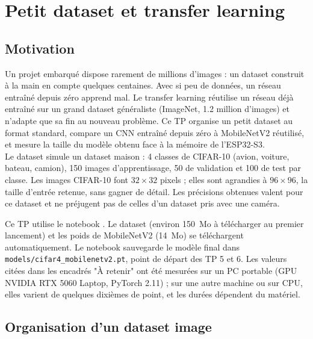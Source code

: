 
\chapter{Petit dataset et transfer learning}

\section*{Motivation}

Un projet embarqué dispose rarement de millions d'images : un dataset construit à la main en compte quelques centaines. Avec si peu de données, un réseau entraîné depuis zéro apprend mal. Le transfer learning réutilise un réseau déjà entraîné sur un grand dataset généraliste (ImageNet, 1.2 million d'images) et n'adapte que sa fin au nouveau problème. Ce TP organise un petit dataset au format standard, compare un CNN entraîné depuis zéro à MobileNetV2 réutilisé, et mesure la taille du modèle obtenu face à la mémoire de l'ESP32-S3. \\

Le dataset simule un dataset maison : 4 classes de CIFAR-10 (avion, voiture, bateau, camion), 150 images d'apprentissage, 50 de validation et 100 de test par classe. Les images CIFAR-10 font $32 \times 32$ pixels ; elles sont agrandies à $96 \times 96$, la taille d'entrée retenue, sans gagner de détail. Les précisions obtenues valent pour ce dataset et ne préjugent pas de celles d'un dataset pris avec une caméra. \\

\begin{imp}
Ce TP utilise le notebook . Le dataset (environ 150~Mo à télécharger au premier lancement) et les poids de MobileNetV2 (14~Mo) se téléchargent automatiquement. Le notebook sauvegarde le modèle final dans \texttt{models/cifar4\_mobilenetv2.pt}, point de départ des TP 5 et 6.
Les valeurs citées dans les encadrés "À retenir" ont été mesurées sur un PC portable (GPU NVIDIA RTX 5060 Laptop, PyTorch 2.11) ; sur une autre machine ou sur CPU, elles varient de quelques dixièmes de point, et les durées dépendent du matériel.
\end{imp}

\section{Organisation d'un dataset image}

